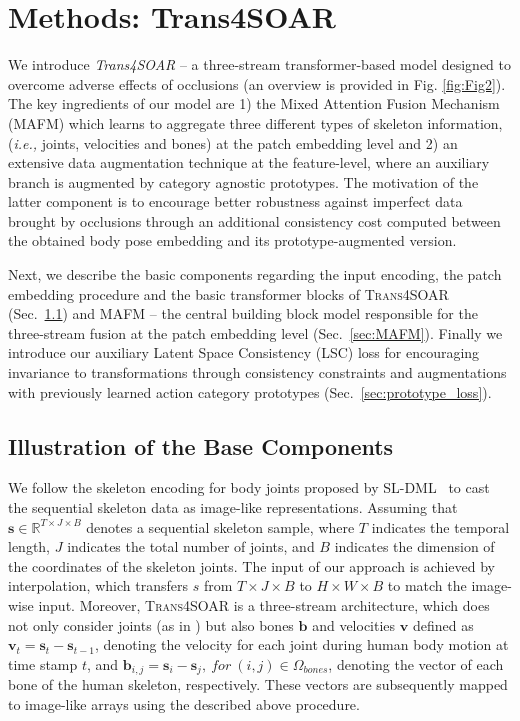 \documentclass[lettersize,journal]{IEEEtran}
\begin{document}
\section{Methods: Trans4SOAR}
We introduce \textit{Trans4SOAR} -- a three-stream transformer-based model designed to overcome adverse effects of occlusions (an overview is provided in Fig. \ref{fig:Fig2}).
The key ingredients of our model are 1) the
Mixed Attention Fusion Mechanism (MAFM) which learns to aggregate three different types of skeleton information,  (\textit{i.e.,} joints, velocities and bones) at the patch embedding level and 2) an extensive data augmentation technique at the feature-level, where an auxiliary branch is augmented by category agnostic prototypes.
The motivation of the latter component is to encourage better robustness against imperfect data brought by occlusions through an additional consistency cost computed between the obtained body pose embedding and its prototype-augmented version.

Next, we describe the basic components regarding the input encoding, the patch embedding procedure and the basic transformer blocks of \textsc{Trans4SOAR} (Sec.~\ref{sec:components_trans4soar}) and MAFM -- the central building block model responsible for the three-stream fusion at the patch embedding level (Sec.~\ref{sec:MAFM}). 
Finally we introduce our auxiliary Latent Space Consistency (LSC) loss for encouraging invariance to  transformations through consistency constraints and augmentations with previously learned action category prototypes (Sec.~\ref{sec:prototype_loss}). 

\subsection{Illustration of the Base Components}
\label{sec:components_trans4soar}
We follow the skeleton encoding for body joints proposed by SL-DML~\cite{memmesheimer2021sl} to cast the sequential skeleton data as image-like representations.
Assuming that $\mathbf{s}{\in}\mathbb{R}^{T\times J\times B}$ denotes a sequential skeleton sample, where $T$ indicates the temporal length, $J$ indicates the total number of joints, and $B$ indicates the dimension of the coordinates of the skeleton joints.
The input of our approach is achieved by interpolation, which transfers $s$ from $T{\times}J{\times}B$ to $H{\times}W{\times}B$ to match the image-wise input.
Moreover,  \textsc{Trans4SOAR} is a three-stream architecture, which does not only consider joints (as in \cite{memmesheimer2021sl}) but also bones $\textbf{b}$ and velocities  $\textbf{v}$ defined as $\textbf{v}_t{=}\textbf{s}_{t}{-}\textbf{s}_{t-1}$, denoting the velocity for each joint during human body motion at time stamp $t$, and $\textbf{b}_{i, j} {=} \textbf{s}_i{-}\textbf{s}_j,~for~(i,j)\in\Omega_{bones}$, denoting the vector of each bone of the human skeleton, respectively.
These vectors are subsequently mapped to image-like arrays using the described above procedure.
\end{document}
